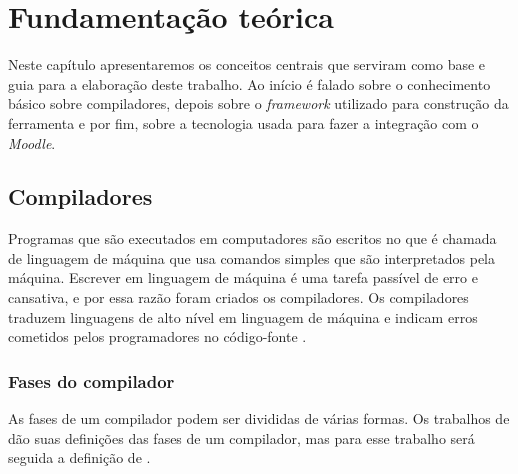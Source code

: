 \chapter{Fundamentação teórica}
\label{cap:fundamentacao-teorica}

Neste capítulo apresentaremos os conceitos centrais que serviram como base e guia para a elaboração deste trabalho. Ao início é falado sobre o conhecimento básico sobre compiladores, depois sobre o \textit{framework} utilizado para construção da ferramenta e por fim, sobre a tecnologia usada para fazer a integração com o \textit{Moodle}.

\section{Compiladores}
Programas que são executados em computadores são escritos no que é chamada de linguagem de máquina que usa comandos simples que são interpretados pela máquina. Escrever em linguagem de máquina é uma tarefa passível de erro e cansativa, e por essa razão foram criados os compiladores. Os compiladores traduzem linguagens de alto nível em linguagem de máquina e indicam erros cometidos pelos programadores no código-fonte \cite{mogensen2024introduction}.

\subsection{Fases do compilador}
As fases de um compilador podem ser divididas de várias formas. Os trabalhos de \textcite{cooper2022engineering,mogensen2024introduction, thain2020introduction} dão suas definições das fases de um compilador, mas para esse trabalho será seguida a definição de \textcite{thain2020introduction}. 

\begin{figure}[ht]
    \captionsetup{width=16cm}
\end{figure}

